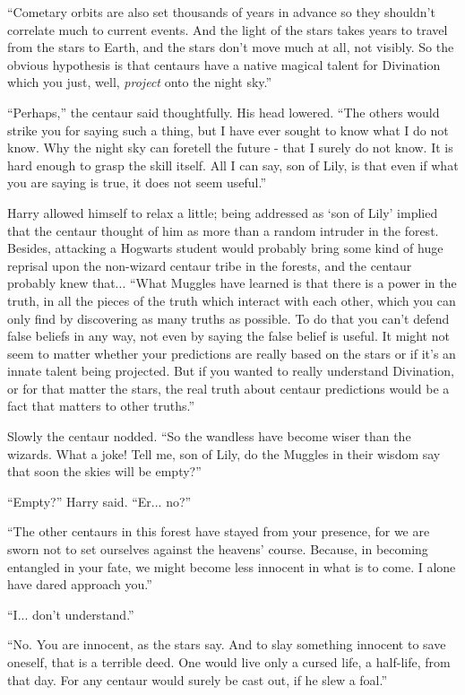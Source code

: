``Cometary orbits are also set thousands of years in advance so they
shouldn't correlate much to current events. And the light of the stars
takes years to travel from the stars to Earth, and the stars don't move
much at all, not visibly. So the obvious hypothesis is that centaurs
have a native magical talent for Divination which you just, well,
\emph{project} onto the night sky.''

``Perhaps,'' the centaur said thoughtfully. His head lowered. ``The
others would strike you for saying such a thing, but I have ever sought
to know what I do not know. Why the night sky can foretell the future -
that I surely do not know. It is hard enough to grasp the skill itself.
All I can say, son of Lily, is that even if what you are saying is true,
it does not seem useful.''

Harry allowed himself to relax a little; being addressed as `son of
Lily' implied that the centaur thought of him as more than a random
intruder in the forest. Besides, attacking a Hogwarts student would
probably bring some kind of huge reprisal upon the non-wizard centaur
tribe in the forests, and the centaur probably knew that... ``What
Muggles have learned is that there is a power in the truth, in all the
pieces of the truth which interact with each other, which you can only
find by discovering as many truths as possible. To do that you can't
defend false beliefs in any way, not even by saying the false belief is
useful. It might not seem to matter whether your predictions are really
based on the stars or if it's an innate talent being projected. But if
you wanted to really understand Divination, or for that matter the
stars, the real truth about centaur predictions would be a fact that
matters to other truths.''

Slowly the centaur nodded. ``So the wandless have become wiser than the
wizards. What a joke! Tell me, son of Lily, do the Muggles in their
wisdom say that soon the skies will be empty?''

``Empty?'' Harry said. ``Er... no?''

``The other centaurs in this forest have stayed from your presence, for
we are sworn not to set ourselves against the heavens' course. Because,
in becoming entangled in your fate, we might become less innocent in
what is to come. I alone have dared approach you.''

``I... don't understand.''

``No. You are innocent, as the stars say. And to slay something innocent
to save oneself, that is a terrible deed. One would live only a cursed
life, a half-life, from that day. For any centaur would surely be cast
out, if he slew a foal.''

